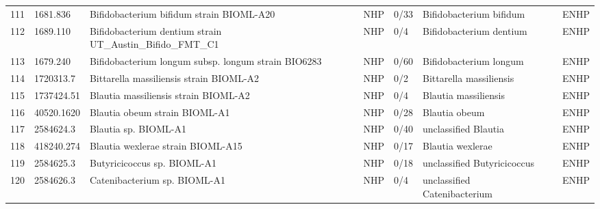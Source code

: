 \begin{longtable}{llllllll}
111 &      1681.836 &                                 Bifidobacterium bifidum strain BIOML-A20 &   NHP &      0/33 &                        Bifidobacterium bifidum &            \cite{poyet2019library,turroni2014bifidobacterium} &  ENHP \\
112 &      1689.110 &               Bifidobacterium dentium strain UT\_Austin\_Bifido\_FMT\_C1 &   NHP &       0/4 &                        Bifidobacterium dentium &                                       \cite{simpson2020draft} &  ENHP \\
113 &      1679.240 &                      Bifidobacterium longum subsp. longum strain BIO6283 &   NHP &      0/60 &                         Bifidobacterium longum &                                     \cite{wong2019beneficial} &  ENHP \\
114 &     1720313.7 &                                  Bittarella massiliensis strain BIOML-A2 &   NHP &       0/2 &                        Bittarella massiliensis &                  \cite{poyet2019library,durand2017bittarella} &  ENHP \\
115 &    1737424.51 &                                     Blautia massiliensis strain BIOML-A2 &   NHP &       0/4 &                           Blautia massiliensis &                     \cite{poyet2019library,durand2017blautia} &  ENHP \\
116 &    40520.1620 &                                            Blautia obeum strain BIOML-A1 &   NHP &      0/28 &                                  Blautia obeum &              \cite{poyet2019library,hatziioanou2017discovery} &  ENHP \\
117 &     2584624.3 &                                                     Blautia sp. BIOML-A1 &   NHP &      0/40 &                           unclassified Blautia &                             \cite{poyet2019library,2584624.3} &  ENHP \\
118 &    418240.274 &                                        Blautia wexlerae strain BIOML-A15 &   NHP &      0/17 &                               Blautia wexlerae &               \cite{poyet2019library,liu2008reclassification} &  ENHP \\
119 &     2584625.3 &                                              Butyricicoccus sp. BIOML-A1 &   NHP &      0/18 &                    unclassified Butyricicoccus &                             \cite{poyet2019library,2584625.3} &  ENHP \\
120 &     2584626.3 &                                             Catenibacterium sp. BIOML-A1 &   NHP &       0/4 &                   unclassified Catenibacterium &                             \cite{poyet2019library,2584626.3} &  ENHP \\

\end{longtable}
